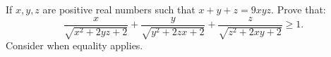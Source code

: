 If $x, y, z$ are positive real numbers such that $x + y + z = 9xyz.$ Prove that:
$$\frac {x} {\sqrt {x^2+2yz+2}}+\frac {y} {\sqrt {y^2+2zx+2}}+\frac {z} {\sqrt {z^2+2xy+2}}\ge 1.$$
Consider when equality applies.